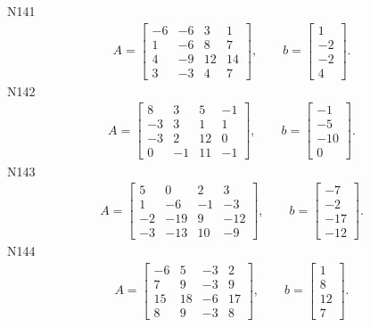 \documentclass[11pt]{report}
\begin{document}
N141
\begin{align*}
 A = \left[\begin{matrix}-6 & -6 & 3 & 1\\1 & -6 & 8 & 7\\4 & -9 & 12 & 14\\3 & -3 & 4 & 7\end{matrix}\right],
\qquad b = \left[\begin{matrix}1\\-2\\-2\\4\end{matrix}\right]. 
 \end{align*}
N142
\begin{align*}
 A = \left[\begin{matrix}8 & 3 & 5 & -1\\-3 & 3 & 1 & 1\\-3 & 2 & 12 & 0\\0 & -1 & 11 & -1\end{matrix}\right],
\qquad b = \left[\begin{matrix}-1\\-5\\-10\\0\end{matrix}\right]. 
 \end{align*}
N143
\begin{align*}
 A = \left[\begin{matrix}5 & 0 & 2 & 3\\1 & -6 & -1 & -3\\-2 & -19 & 9 & -12\\-3 & -13 & 10 & -9\end{matrix}\right],
\qquad b = \left[\begin{matrix}-7\\-2\\-17\\-12\end{matrix}\right]. 
 \end{align*}
N144
\begin{align*}
 A = \left[\begin{matrix}-6 & 5 & -3 & 2\\7 & 9 & -3 & 9\\15 & 18 & -6 & 17\\8 & 9 & -3 & 8\end{matrix}\right],
\qquad b = \left[\begin{matrix}1\\8\\12\\7\end{matrix}\right]. 
 \end{align*}
\end{document}
